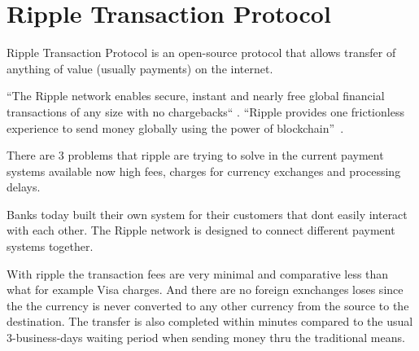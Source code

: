 \section{Ripple Transaction Protocol}

Ripple Transaction Protocol is an open-source protocol that allows
transfer of anything of value (usually payments) on the internet.

``The Ripple network enables secure, instant and nearly free global
financial transactions of any size with no chargebacks``
\cite{hid-sp18-506-RippleNetwork}.  ``Ripple provides one frictionless
experience to send money globally using the power of
blockchain''~\cite{hid-sp18-506-GlobalPayment}.


There are 3 problems that ripple are trying to solve in the current
payment systems available now high fees, charges for currency
exchanges and processing delays.

Banks today built their own system for their customers that dont
easily interact with each other.  The Ripple network is designed to
connect different payment systems together.

With ripple the transaction fees are very minimal and comparative less
than what for example Visa charges. And there are no foreign
exnchanges loses since the the currency is never converted to any
other currency from the source to the destination. The transfer is
also completed within minutes compared to the usual 3-business-days
waiting period when sending money thru the traditional means.
